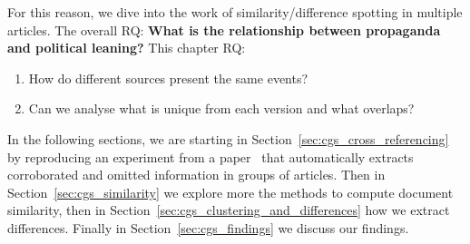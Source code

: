 For this reason, we dive into the work of similarity/difference spotting in multiple articles.
The overall RQ: \textbf{What is the relationship between propaganda and political leaning?}
This chapter RQ: 
\begin{enumerate}
    \item How do different sources present the same events?
    \item Can we analyse what is unique from each version and what overlaps?
\end{enumerate}





In the following sections, we are starting in Section~\ref{sec:cgs_cross_referencing} by reproducing an experiment from a paper~\citep{bountouridis2018explaining} that automatically extracts corroborated and omitted information in groups of articles. Then in Section~\ref{sec:cgs_similarity} we explore more the methods
 to compute document similarity, then in Section~\ref{sec:cgs_clustering_and_differences} how we extract differences. Finally in Section~\ref{sec:cgs_findings} we discuss our findings.















